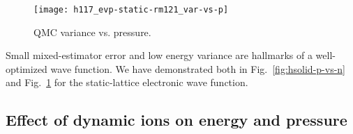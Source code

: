 \begin{figure}[h]
\centering
\texttt{[image: h117\_evp-static-rm121\_var-vs-p]}
\caption{QMC variance vs. pressure.}
\label{fig:hsolid-v-vs-p}
\end{figure}

Small mixed-estimator error and low energy variance are hallmarks of a well-optimized wave function. We have demonstrated both in Fig.~\ref{fig:hsolid-p-vs-n} and Fig.~\ref{fig:hsolid-v-vs-p} for the static-lattice electronic wave function.

%
%

\subsection{Effect of dynamic ions on energy and pressure}

